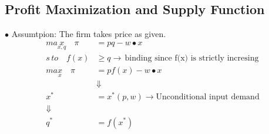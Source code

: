 \documentclass[letterpaper,13pt,single,pdftex]{scrartcl}
\begin{document}
 \subsection{Profit Maximization and Supply Function}
 
 $\bullet$ Assumtpion: The firm takes price as given.
 \begin{align*}
 max\limits_{x,q} \quad \pi &= pq - w\bullet x\\
 s\, to\quad f(x) &\ge q \rightarrow\, \text{binding since f(x) is strictly incresing}\\
 max\limits_{x}\quad \pi &= pf(x) - w\bullet x\\
 &\Downarrow\\
 x^*&= x^*(p,w) \rightarrow \text{Unconditional input demand}\\
 \Downarrow\\
 q^*&=f(x^*)
 \end{align*}
 
\end{document}
